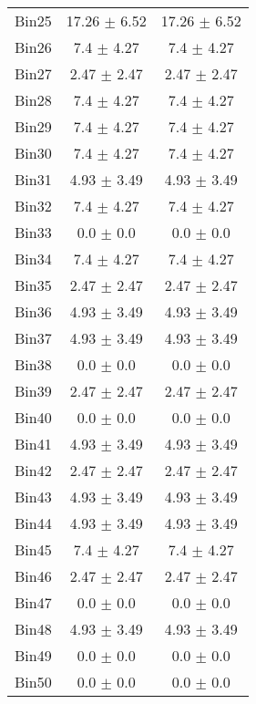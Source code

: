 \begin{tabular}{|c|c|c|}
     Bin25 & 17.26 $\pm$ 6.52 & 17.26 $\pm$ 6.52 \\ \cline{1-3} 
     Bin26 & 7.4 $\pm$ 4.27 & 7.4 $\pm$ 4.27 \\ \cline{1-3} 
     Bin27 & 2.47 $\pm$ 2.47 & 2.47 $\pm$ 2.47 \\ \cline{1-3} 
     Bin28 & 7.4 $\pm$ 4.27 & 7.4 $\pm$ 4.27 \\ \cline{1-3} 
     Bin29 & 7.4 $\pm$ 4.27 & 7.4 $\pm$ 4.27 \\ \cline{1-3} 
     Bin30 & 7.4 $\pm$ 4.27 & 7.4 $\pm$ 4.27 \\ \cline{1-3} 
     Bin31 & 4.93 $\pm$ 3.49 & 4.93 $\pm$ 3.49 \\ \cline{1-3} 
     Bin32 & 7.4 $\pm$ 4.27 & 7.4 $\pm$ 4.27 \\ \cline{1-3} 
     Bin33 & 0.0 $\pm$ 0.0 & 0.0 $\pm$ 0.0 \\ \cline{1-3} 
     Bin34 & 7.4 $\pm$ 4.27 & 7.4 $\pm$ 4.27 \\ \cline{1-3} 
     Bin35 & 2.47 $\pm$ 2.47 & 2.47 $\pm$ 2.47 \\ \cline{1-3} 
     Bin36 & 4.93 $\pm$ 3.49 & 4.93 $\pm$ 3.49 \\ \cline{1-3} 
     Bin37 & 4.93 $\pm$ 3.49 & 4.93 $\pm$ 3.49 \\ \cline{1-3} 
     Bin38 & 0.0 $\pm$ 0.0 & 0.0 $\pm$ 0.0 \\ \cline{1-3} 
     Bin39 & 2.47 $\pm$ 2.47 & 2.47 $\pm$ 2.47 \\ \cline{1-3} 
     Bin40 & 0.0 $\pm$ 0.0 & 0.0 $\pm$ 0.0 \\ \cline{1-3} 
     Bin41 & 4.93 $\pm$ 3.49 & 4.93 $\pm$ 3.49 \\ \cline{1-3} 
     Bin42 & 2.47 $\pm$ 2.47 & 2.47 $\pm$ 2.47 \\ \cline{1-3} 
     Bin43 & 4.93 $\pm$ 3.49 & 4.93 $\pm$ 3.49 \\ \cline{1-3} 
     Bin44 & 4.93 $\pm$ 3.49 & 4.93 $\pm$ 3.49 \\ \cline{1-3} 
     Bin45 & 7.4 $\pm$ 4.27 & 7.4 $\pm$ 4.27 \\ \cline{1-3} 
     Bin46 & 2.47 $\pm$ 2.47 & 2.47 $\pm$ 2.47 \\ \cline{1-3} 
     Bin47 & 0.0 $\pm$ 0.0 & 0.0 $\pm$ 0.0 \\ \cline{1-3} 
     Bin48 & 4.93 $\pm$ 3.49 & 4.93 $\pm$ 3.49 \\ \cline{1-3} 
     Bin49 & 0.0 $\pm$ 0.0 & 0.0 $\pm$ 0.0 \\ \cline{1-3} 
     Bin50 & 0.0 $\pm$ 0.0 & 0.0 $\pm$ 0.0 \\ \cline{1-3} 

\end{tabular}
